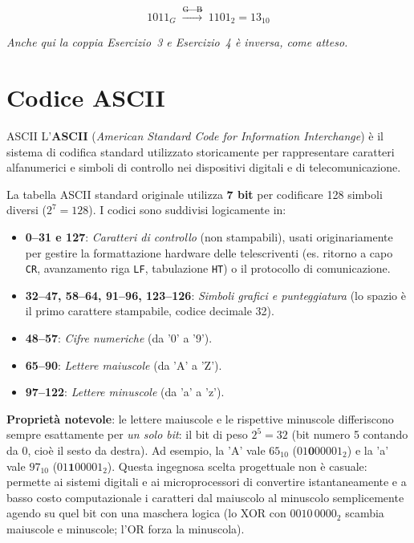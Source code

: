 \[
1011_G \;\xrightarrow{\text{G}\to\text{B}}\; \boxed{1101_2 = 13_{10}}
\]

\vspace{0.5em}
\noindent\textit{Anche qui la coppia Esercizio~3 e Esercizio~4 è inversa, come atteso.}


\section{Codice ASCII}
 
\begin{definizione}{ASCII}
L'\textbf{ASCII} (\emph{American Standard Code for Information Interchange}) è il sistema di codifica standard utilizzato storicamente per rappresentare caratteri alfanumerici e simboli di controllo nei dispositivi digitali e di telecomunicazione.
\end{definizione}
 
La tabella ASCII standard originale utilizza \textbf{7 bit} per codificare 128 simboli diversi ($2^7 = 128$). I codici sono suddivisi logicamente in:
\begin{itemize}[leftmargin=1.5em]
    \item \textbf{0--31 e 127}: \emph{Caratteri di controllo} (non stampabili), usati originariamente per gestire la formattazione hardware delle telescriventi (es. ritorno a capo \texttt{CR}, avanzamento riga \texttt{LF}, tabulazione \texttt{HT}) o il protocollo di comunicazione.
    \item \textbf{32--47, 58--64, 91--96, 123--126}: \emph{Simboli grafici e punteggiatura} (lo spazio è il primo carattere stampabile, codice decimale 32).
    \item \textbf{48--57}: \emph{Cifre numeriche} (da '0' a '9').
    \item \textbf{65--90}: \emph{Lettere maiuscole} (da 'A' a 'Z').
    \item \textbf{97--122}: \emph{Lettere minuscole} (da 'a' a 'z').
\end{itemize}

\noindent \textbf{Proprietà notevole}: le lettere maiuscole e le rispettive minuscole differiscono sempre esattamente per \emph{un solo bit}: il bit di peso $2^5=32$ (bit numero 5 contando da 0, cioè il sesto da destra).
Ad esempio, la 'A' vale $65_{10}$ ($01\textbf{0}00001_2$) e la 'a' vale $97_{10}$ ($01\textbf{1}00001_2$). Questa ingegnosa scelta progettuale non è casuale: permette ai sistemi digitali e ai microprocessori di convertire istantaneamente e a basso costo computazionale i caratteri dal maiuscolo al minuscolo semplicemente agendo su quel bit con una maschera logica (lo XOR con $0010\,0000_2$ scambia maiuscole e minuscole; l'OR forza la minuscola).

